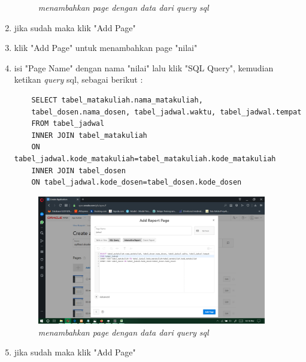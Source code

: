 \documentclass[12pt]{ociamthesis}  %
\begin{document}
\begin{enumerate}
\begin{figure}[H]
    \caption{\textit{menambahkan page dengan data dari query sql}}
    \label{foto21}
 	\end{figure}
	\item jika sudah maka klik "Add Page"
	\item  klik "Add Page" untuk menambahkan page "nilai"
	\item isi "Page Name" dengan nama "nilai" lalu klik "SQL Query", kemudian ketikan \textit{query} sql, sebagai berikut :
	\begin{verbatim}
	SELECT tabel_matakuliah.nama_matakuliah, 
	tabel_dosen.nama_dosen, tabel_jadwal.waktu, tabel_jadwal.tempat
	FROM tabel_jadwal
	INNER JOIN tabel_matakuliah 
	ON tabel_jadwal.kode_matakuliah=tabel_matakuliah.kode_matakuliah
	INNER JOIN tabel_dosen 
	ON tabel_jadwal.kode_dosen=tabel_dosen.kode_dosen
	\end{verbatim}
	\begin{figure}[H]
    \centering
	 \includegraphics[width=10cm]{figures/add page/Screenshot (246).png} 
    \caption{\textit{menambahkan page dengan data dari query sql}}
    \label{foto21}
 	\end{figure}
	\item jika sudah maka klik "Add Page"
\end{enumerate}
\end{document}
